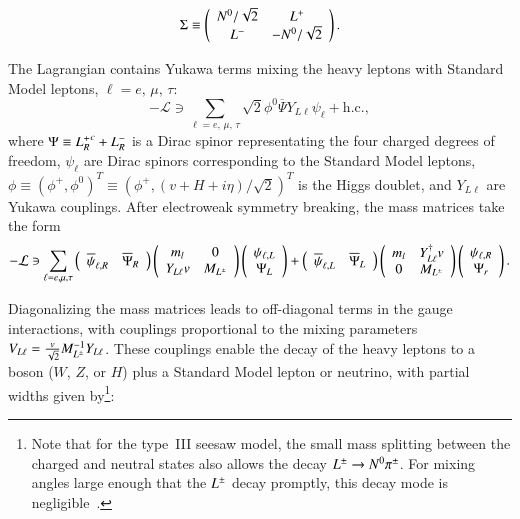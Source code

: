 \begin{equation}
	\Sigma\equiv \left(\begin{array}{cc} N^{0}/\sqrt{2} & L^{+} \\ L^{-} & -N^{0}/\sqrt{2}\end{array}\right).
\end{equation}

The Lagrangian contains Yukawa terms mixing the heavy leptons with Standard Model leptons, $\ell=e,\,\mu,\,\tau$:
\begin{equation}
  -\mathcal{L} \ni \sum_{\ell=e,\,\mu,\,\tau} \sqrt{2}\phi^0 \overline{\Psi} Y_{L \ell} \psi_{\ell} + \mathrm{h.c.},
\end{equation}
where $\Psi\equiv {\ensuremath{L^{+}}_R}^c + L^{-}_R$ is a Dirac spinor representating the four charged degrees of freedom, $\psi_{\ell}$ are Dirac spinors corresponding to the Standard Model leptons, $\phi\equiv(\phi^+,\phi^0)^T\equiv (\phi^+,(v+H+i\eta)/\sqrt{2})^T$ is the Higgs doublet, and $Y_{L \ell}$ are Yukawa couplings. After electroweak symmetry breaking, the mass matrices take the form
\begin{equation}
-\mathcal{L} \ni \sum_{\ell=e,\mu,\tau} \left(\begin{array}{cc}\overline{\psi}_{\ell,R} & \overline{\Psi}_R \end{array} \right) \left(\begin{array}{cc} m_l & 0 \\ Y_{L \ell}v & M_{\lpm} \end{array}\right) \left(\begin{array}{c} \psi_{\ell,L} \\ \Psi_L \end{array}\right)  + \left(\begin{array}{cc}\overline{\psi}_{\ell,L} & \overline{\Psi}_L\end{array}\right) \left(\begin{array}{cc} m_l & Y_{L \ell}^{\dagger}v \\ 0 & M_{\lpm} \end{array}\right) \left(\begin{array}{c} \psi_{\ell,R} \\ \Psi_r \end{array}\right).
\end{equation}

Diagonalizing the mass matrices leads to off-diagonal terms in the gauge interactions, with couplings proportional to the mixing parameters $V_{L\ell}=\frac{v}{\sqrt{2}} M_{L^{\pm}}^{-1} Y_{L \ell}$. These couplings enable the decay of the heavy leptons to a boson ($W$, $Z$, or $H$) plus a Standard Model lepton or neutrino, with partial widths given by\footnote{Note that for the type~III seesaw model, the small mass splitting between the charged and neutral states also allows the decay $\lpm\rightarrow \lzero\pi^{\pm}$. For mixing angles large enough that the $L^{\pm}$ decay promptly, this decay mode is negligible~\cite{Frampton:1999kr}.}:

